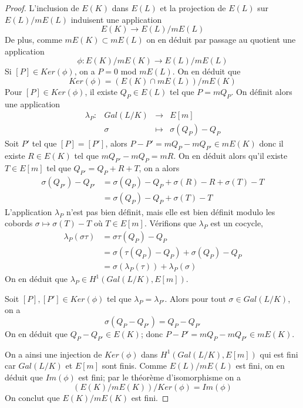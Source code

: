\documentclass{article}
\begin{document}
\begin{proof}
L'inclusion de $E(K)$ dans $E(L)$ et la projection de $E(L)$ sur $E(L)/mE(L)$ induisent une application
\begin{equation*}
E(K) \longrightarrow E(L)/mE(L)
\end{equation*}
De plus, comme $mE(K) \subset mE(L)$ on en déduit par passage au quotient une application
\begin{equation*}
\phi : E(K)/mE(K) \longrightarrow E(L)/mE(L)
\end{equation*}
Si $[P]\in Ker(\phi)$, on a $P = 0$ mod $mE(L)$. On en déduit que
\begin{equation*}
Ker(\phi) = (E(K)\cap mE(L))/mE(K)
\end{equation*}
Pour $[P]\in Ker(\phi)$, il existe $Q_{P}\in E(L)$ tel que $P=mQ_{P}$. On définit alors une application
\begin{equation*}
\begin{array}{lrcl}
\lambda_{P} :&Gal(L/K) & \longrightarrow & E[m] \\
	 & \sigma & \longmapsto & \sigma(Q_{P}) - Q_{P}
\end{array}
\end{equation*}
Soit $P'$ tel que $[P]=[P']$, alors $P-P'=mQ_{P}-mQ_{P'}\in mE(K)$
donc il existe $R\in E(K)$ tel que $mQ_{P'} - mQ_{P} = mR$. On en déduit alors qu'il existe
$T\in E[m]$ tel que $Q_{P'} = Q_{P} + R + T$, on a alors
\begin{align*}
\sigma(Q_{P'}) - Q_{P'} &= \sigma(Q_{P}) - Q_{P} + \sigma(R) - R + \sigma(T) - T\\
			&= \sigma(Q_{P}) - Q_{P} + \sigma(T) - T
\end{align*}
L'application $\lambda_{P}$ n'est pas bien définit, mais elle est bien définit modulo les cobords
$\sigma \longmapsto \sigma(T) - T$ où $T\in E[m]$. Vérifions que $\lambda_{P}$ est un cocycle,
\begin{align*}
\lambda_{P}(\sigma \tau) &= \sigma \tau(Q_{P}) - Q_{P} \\
			&= \sigma(\tau(Q_{P}) - Q_{P}) + \sigma(Q_{P}) - Q_{P} \\
			&= \sigma(\lambda_{P}(\tau)) + \lambda_{P}(\sigma)
\end{align*}
On en déduit que $\lambda_{P} \in H^1(Gal(L/K), E[m])$.

Soit $[P], [P'] \in Ker(\phi)$ tel que $\lambda_{P}=\lambda_{P'}$.
Alors pour tout $\sigma \in Gal(L/K)$, on a
\begin{equation*}
\sigma(Q_{P}-Q_{P'}) = Q_{P} - Q_{P'}
\end{equation*}
On en déduit que $Q_{P} - Q_{P'} \in E(K)$; donc $P - P' = mQ_{P} - mQ_{P'} \in mE(K)$.

On a ainsi une injection de $Ker(\phi)$ dans $H^1(Gal(L/K), E[m])$ qui est fini car $Gal(L/K)$ et $E[m]$ sont finis.
Comme $E(L)/mE(L)$ est fini, on en déduit que $Im(\phi)$ est fini; par le théorème d'isomorphisme on a
\begin{equation*}
(E(K)/mE(K))/Ker(\phi) = Im(\phi)
\end{equation*}
On conclut que $E(K)/mE(K)$ est fini.
\end{proof}
\end{document}
